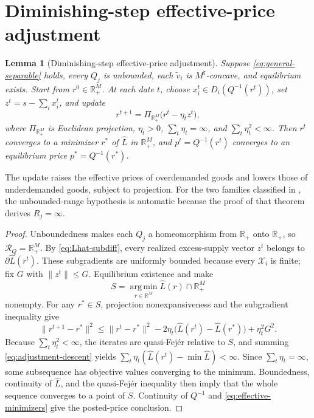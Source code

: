 \documentclass[11pt,a4paper,fleqn]{article}
\theoremstyle{plain}
\newtheorem{lemma}{Lemma}[section]
\theoremstyle{definition}
\newcommand{\R}{\mathbb{R}}
\newcommand{\argmin}{\operatorname*{arg\,min}}
\newcommand{\Xcal}{\mathcal{X}}
\begin{document}
\section{Diminishing-step effective-price adjustment}\label{app:adjustment}

\begin{lemma}[Diminishing-step effective-price adjustment]\label{lem:adjustment-convergence}
Suppose \eqref{eq:general-separable} holds, every $Q_j$ is unbounded, each $\widetilde v_i$ is $M^\natural$-concave, and equilibrium exists. Start from $r^0\in\R_+^M$. At each date $t$, choose $x_i^t\in D_i(Q^{-1}(r^t))$, set $z^t=s-\sum_i x_i^t$, and update
\begin{equation}\label{eq:projected-adjustment}
r^{t+1}=\Pi_{\R_+^M}\bigl(r^t-\eta_t z^t\bigr),
\end{equation}
where $\Pi_{\R_+^M}$ is Euclidean projection, $\eta_t>0$, $\sum_t\eta_t=\infty$, and $\sum_t\eta_t^2<\infty$. Then $r^t$ converges to a minimizer $r^*$ of $\widehat L$ in $\R_+^M$, and $p^t=Q^{-1}(r^t)$ converges to an equilibrium price $p^*=Q^{-1}(r^*)$.
\end{lemma}

The update raises the effective prices of overdemanded goods and lowers those of underdemanded goods, subject to projection. For the two families classified in , the unbounded-range hypothesis is automatic because the proof of that theorem derives $R_j=\infty$.

\begin{proof}
Unboundedness makes each $Q_j$ a homeomorphism from $\R_+$ onto $\R_+$, so $\mathcal R_Q=\R_+^M$. By \eqref{eq:Lhat-subdiff}, every realized excess-supply vector $z^t$ belongs to $\partial\widehat L(r^t)$. These subgradients are uniformly bounded because every $\Xcal_i$ is finite; fix $G$ with $\lVert z^t\rVert\le G$. Equilibrium existence and  make
\[
S=\argmin_{r\in\R^M}\widehat L(r)\cap\R_+^M
\]
nonempty. For any $r^*\in S$, projection nonexpansiveness and the subgradient inequality give
\begin{equation}\label{eq:adjustment-descent}
\lVert r^{t+1}-r^*\rVert^2
\le
\lVert r^t-r^*\rVert^2
-2\eta_t\bigl(\widehat L(r^t)-\widehat L(r^*)\bigr)
+\eta_t^2G^2.
\end{equation}
Because $\sum_t\eta_t^2<\infty$, the iterates are quasi-Fej\'er relative to $S$, and summing \eqref{eq:adjustment-descent} yields
$\sum_t\eta_t(\widehat L(r^t)-\min\widehat L)<\infty$.
Since $\sum_t\eta_t=\infty$, some subsequence has objective values converging to the minimum. Boundedness, continuity of $\widehat L$, and the quasi-Fej\'er inequality then imply that the whole sequence converges to a point of $S$. Continuity of $Q^{-1}$ and \eqref{eq:effective-minimizers} give the posted-price conclusion.
\end{proof}
\end{document}
